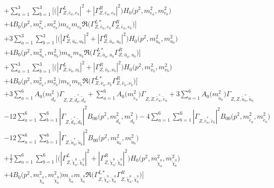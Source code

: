 \begin{itemize}
\begin{align}
 &+\sum_{a=1}^{3}\sum_{b=1}^{3} \Big[\Big(|{\Gamma^L_{Z,\bar{e}_{{a}},e_{{b}}}}|^2 + |{\Gamma^R_{Z,\bar{e}_{{a}},e_{{b}}}}|^2\Big){H_0\Big(p^{2},m^2_{e_{{a}}},m^2_{e_{{b}}}\Big)} \nonumber \\ & +4 {B_0\Big(p^{2},m^2_{e_{{a}}},m^2_{e_{{b}}}\Big)} m_{e_{{a}}} m_{e_{{b}}} {\Re\Big({\Gamma^{L*}_{Z,\bar{e}_{{a}},e_{{b}}}} {\Gamma^R_{Z,\bar{e}_{{a}},e_{{b}}}} \Big)} \Big]\nonumber \\ 
 &+3 \sum_{a=1}^{3}\sum_{b=1}^{3} \Big[\Big(|{\Gamma^L_{Z,\bar{u}_{{a}},u_{{b}}}}|^2 + |{\Gamma^R_{Z,\bar{u}_{{a}},u_{{b}}}}|^2\Big){H_0\Big(p^{2},m^2_{u_{{a}}},m^2_{u_{{b}}}\Big)} \nonumber \\ & +4 {B_0\Big(p^{2},m^2_{u_{{a}}},m^2_{u_{{b}}}\Big)} m_{u_{{a}}} m_{u_{{b}}} {\Re\Big({\Gamma^{L*}_{Z,\bar{u}_{{a}},u_{{b}}}} {\Gamma^R_{Z,\bar{u}_{{a}},u_{{b}}}} \Big)} \Big] \nonumber \\ 
 &+\sum_{a=1}^{3}\sum_{b=1}^{3} \Big[\Big(|{\Gamma^L_{Z,\bar{\nu}_{{a}},\nu_{{b}}}}|^2 + |{\Gamma^R_{Z,\bar{\nu}_{{a}},\nu_{{b}}}}|^2\Big){H_0\Big(p^{2},m^2_{\nu_{{a}}},m^2_{\nu_{{b}}}\Big)} \nonumber \\ & +4 {B_0\Big(p^{2},m^2_{\nu_{{a}}},m^2_{\nu_{{b}}}\Big)} m_{\nu_{{a}}} m_{\nu_{{b}}} {\Re\Big({\Gamma^{L*}_{Z,\bar{\nu}_{{a}},\nu_{{b}}}} {\Gamma^R_{Z,\bar{\nu}_{{a}},\nu_{{b}}}} \Big)} \Big]\nonumber \\ 
 &+3 \sum_{a=1}^{6}{A_0\Big(m^2_{\tilde{d}_{{a}}}\Big)} {\Gamma_{Z,Z,\tilde{d}^*_{{a}},\tilde{d}_{{a}}}}  +\sum_{a=1}^{6}{A_0\Big(m^2_{\tilde{e}_{{a}}}\Big)} {\Gamma_{Z,Z,\tilde{e}^*_{{a}},\tilde{e}_{{a}}}} +3 \sum_{a=1}^{6}{A_0\Big(m^2_{\tilde{u}_{{a}}}\Big)} {\Gamma_{Z,Z,\tilde{u}^*_{{a}},\tilde{u}_{{a}}}}  \nonumber \\ 
 &-12 \sum_{a=1}^{6}\sum_{b=1}^{6}|{\Gamma_{Z,\tilde{d}^*_{{a}},\tilde{d}_{{b}}}}|^2 {B_{00}\Big(p^{2},m^2_{\tilde{d}_{{a}}},m^2_{\tilde{d}_{{b}}}\Big)}  -4 \sum_{a=1}^{6}\sum_{b=1}^{6}|{\Gamma_{Z,\tilde{e}^*_{{a}},\tilde{e}_{{b}}}}|^2 {B_{00}\Big(p^{2},m^2_{\tilde{e}_{{a}}},m^2_{\tilde{e}_{{b}}}\Big)}  \nonumber \\ 
 &-12 \sum_{a=1}^{6}\sum_{b=1}^{6}|{\Gamma_{Z,\tilde{u}^*_{{a}},\tilde{u}_{{b}}}}|^2 {B_{00}\Big(p^{2},m^2_{\tilde{u}_{{a}}},m^2_{\tilde{u}_{{b}}}\Big)}  \nonumber \\ 
 &+\frac{1}{2} \sum_{a=1}^{6}\sum_{b=1}^{6} \Big[\Big(|{\Gamma^L_{Z,\tilde{\chi}^0_{{a}},\tilde{\chi}^0_{{b}}}}|^2 + |{\Gamma^R_{Z,\tilde{\chi}^0_{{a}},\tilde{\chi}^0_{{b}}}}|^2\Big){H_0\Big(p^{2},m^2_{\tilde{\chi}^0_{{a}}},m^2_{\tilde{\chi}^0_{{b}}}\Big)} \nonumber \\ & +4 {B_0\Big(p^{2},m^2_{\tilde{\chi}^0_{{a}}},m^2_{\tilde{\chi}^0_{{b}}}\Big)} m_{\tilde{\chi}^0_{{a}}} m_{\tilde{\chi}^0_{{b}}} {\Re\Big({\Gamma^{L*}_{Z,\tilde{\chi}^0_{{a}},\tilde{\chi}^0_{{b}}}} {\Gamma^R_{Z,\tilde{\chi}^0_{{a}},\tilde{\chi}^0_{{b}}}} \Big)} \Big] \nonumber \\ 

\end{align}
\end{itemize}
